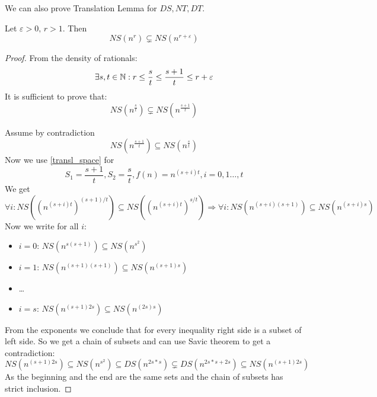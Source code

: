 \begin{note}
	We can also prove Translation Lemma for $DS, NT, DT$.
\end{note}

\begin{theorem}
	Let $\varepsilon > 0,\, r > 1$. Then
	\[ NS(n^r) \subsetneq NS(n^{r + \varepsilon}) \]
\end{theorem}
\begin{proof}
	From the density of rationals:
	\[ \exists s,t \in \operatorname{\mathbb{N}}: r \leq \frac{s}{t} \leq \frac{s + 1}{t} \leq r + \varepsilon \]
	It is sufficient to prove that:
	\[ NS(n^{\frac{s}{t}}) \subsetneq NS(n^{\frac{s + 1}{t}}) \]

	Assume by contradiction
	\[ NS(n^{\frac{s+1}{t}}) \subseteq NS(n^{\frac{s}{t}}) \]
	Now we use \cref{transl_space} for
	\[ S_1 = \frac{s+1}{t}, S_2 = \frac{s}{t}, f(n) = n^{(s + i)t}, i = 0, 1 \ldots, t \]
	We get
	\[ \forall i: NS((n^{(s + i)t})^{(s + 1)/t}) \subseteq NS((n^{(s + i)t})^{s/t}) \Rightarrow \forall i: NS(n^{(s + i)(s + 1)}) \subseteq NS(n^{(s + i)s}) \]
	Now we write for all $i$:
	\begin{itemize}
		\item $i = 0:\, NS(n^{s(s + 1)}) \subseteq NS(n^{s^2}) $
		\item $i = 1:\, NS(n^{(s + 1)(s + 1)}) \subseteq NS(n^{(s + 1)s}) $
		\item \ldots
		\item $i = s:\, NS(n^{(s + 1)2s}) \subseteq NS(n^{(2s)s}) $
	\end{itemize}
	From the exponents we conclude that for every inequality right side is a subset of left side.
	So we get a chain of subsets and can use Savic theorem to get a contradiction:
	\[ NS(n^{(s + 1)2s}) \subseteq NS(n^{s^2}) \subseteq DS(n^{2s * s}) \subsetneq DS(n^{2s * s + 2s}) \subseteq NS(n^{(s + 1)2s}) \]
	As the beginning and the end are the same sets and the chain of subsets has strict inclusion.

\end{proof}
